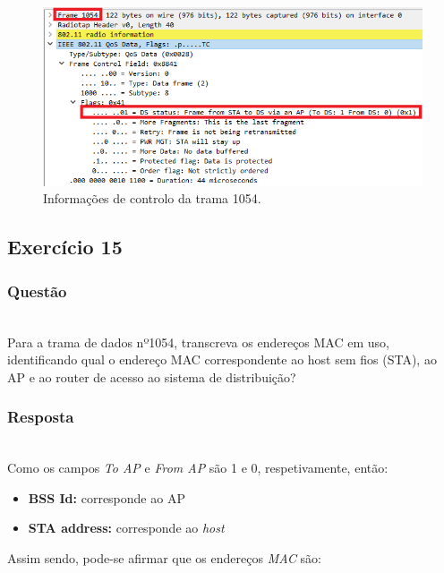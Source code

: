 \documentclass{llncs}
\begin{document}
\begin{figure}
  \begin{center}
  \includegraphics[scale=0.6]{./imagens/p14.png} 
  \end{center}
  \caption{Informações de controlo da trama 1054.}
  \label{fig:control_frame}
\end{figure}

\clearpage
\subsection{Exercício 15}
\subsubsection{Questão}\rule[-10pt]{0pt}{10pt}\\

Para a trama de dados nº1054, transcreva os endereços MAC em uso, identificando qual o endereço MAC correspondente ao host sem fios (STA), ao AP e ao router de acesso ao sistema de distribuição?

\subsubsection{Resposta}\rule[-10pt]{0pt}{10pt}\\

Como os campos \textit{To AP} e \textit{From AP} são 1 e 0, respetivamente, então:

\begin{itemize}
  \item \textbf{BSS Id:} corresponde ao AP

  \item \textbf{STA address:} corresponde ao \textit{host}
\end{itemize}

Assim sendo, pode-se afirmar que os endereços \textit{MAC} são:
\end{document}
